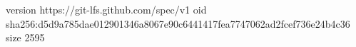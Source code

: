 version https://git-lfs.github.com/spec/v1
oid sha256:d5d9a785dae012901346a8067e90c6441417fea7747062ad2fcef736e24b4c36
size 2595
